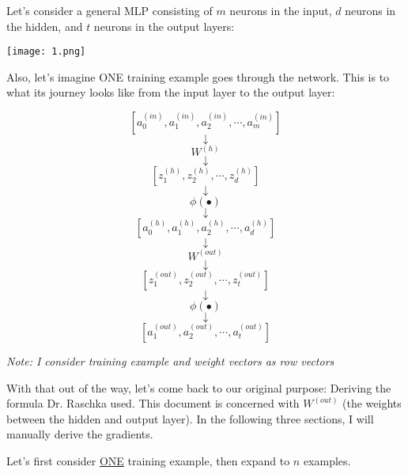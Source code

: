\documentclass[../main.tex]{subfiles}
\begin{document}
Let's consider a general MLP consisting of $m$ neurons in the input, $d$ neurons
in the hidden, and $t$ neurons in the output layers:

\begin{center}
    \texttt{[image: 1.png]}
\end{center}

Also, let's imagine ONE training example goes through the network. This is
to what its journey looks like from the input layer to the output layer:

\pagebreak
\[[a_0^{(in)}, a_1^{(in)}, a_2^{(in)}, \cdots, a_m^{(in)}]\]
\[\downarrow\]
\[W^{(h)}\]
\[\downarrow\]                  
\[[z_1^{(h)}, z_2^{(h)}, \cdots, z_d^{(h)}]\]
\[\downarrow\]
\[\phi(\bullet)\]
\[\downarrow\]
\[[a_0^{(h)}, a_1^{(h)}, a_2^{(h)}, \cdots, a_d^{(h)}]\]
\[\downarrow\]
\[W^{(out)}\]
\[\downarrow\]                  
\[[z_1^{(out)}, z_2^{(out)}, \cdots, z_t^{(out)}]\]
\[\downarrow\]
\[\phi(\bullet)\]
\[\downarrow\]
\[[a_1^{(out)}, a_2^{(out)}, \cdots, a_t^{(out)}]\]

\vspace{5mm} %

\emph{Note: I consider training example and weight vectors as row vectors}

\vspace{5mm} %

With that out of the way, let's come back to our original purpose: Deriving the
formula Dr. Raschka used. This document is concerned with $W^{(out)}$ 
(the weights between the hidden and output layer). In the following three sections,
I will manually derive the gradients.

\vspace{5mm} %

Let's first consider \underline{ONE} training example, then expand to $n$ examples.

\end{document}

